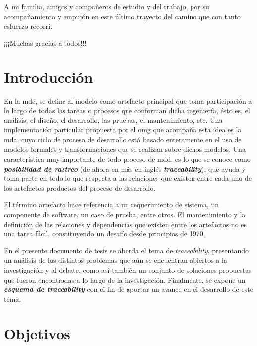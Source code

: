 \documentclass[a4paper,12pt,twoside,spanish,openright]{book}
\begin{document}
\bigskip

A mi familia, amigos y compañeros de estudio y del trabajo, por su acompañamiento y empujón en este último trayecto del camino que con tanto esfuerzo recorrí.

\bigskip

¡¡¡Muchas gracias a todos!!!



\chapter{Introducción}


En la \gls{mde}, se define al modelo como artefacto principal que toma participación a lo largo de todas las tareas o procesos que conforman dicha ingeniería, ésto es, el análisis, el diseño, el desarrollo, las pruebas, el mantenimiento, etc. Una implementación particular propuesta por el \gls{omg} que acompaña esta idea es la \gls{mda}, cuyo ciclo de proceso de desarrollo está basado enteramente en el uso de modelos formales y transformaciones que se realizan sobre dichos modelos. Una característica muy importante de todo proceso de \gls{mdd}, es lo que se conoce como \textit{\textbf{posibilidad de rastreo}} (de ahora en más en inglés \textit{\textbf{traceability}}), que ayuda y toma parte en todo lo que respecta a las relaciones que existen entre cada uno de los artefactos productos del proceso de desarrollo.

El término artefacto hace referencia a un requerimiento de sistema, un componente de software, un caso de prueba, entre otros. El mantenimiento y la definición de las relaciones y dependencias que existen entre los artefactos no es una tarea fácil, constituyendo un desafío desde principios de 1970.

En el presente documento de tesis se aborda el tema de \textit{traceability}, presentando un análisis de los distintos problemas que aún se encuentran abiertos a la investigación y al debate, como así también un conjunto de soluciones propuestas que fueron encontradas a lo largo de la investigación. Finalmente, se expone un \textit{\textbf{esquema de traceability}} con el fin de aportar un avance en el desarrollo de este tema.




\chapter{Objetivos}
\end{document}
